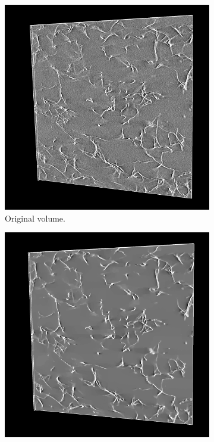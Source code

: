\begin{figure}[H]
  \centering
  \begin{subfigure}{0.5\textwidth}
    \centering
    \includegraphics[width=0.9\linewidth]{Figures/chapter-image/pipeline_screenshots/pectin_original.png}
    \caption{Original volume.}
    \label{fig:pectin_original}
  \end{subfigure}%
  \begin{subfigure}{0.5\textwidth}
    \centering
    \includegraphics[width=0.9\linewidth]{Figures/chapter-image/pipeline_screenshots/pectin_denoised_tv20.png}

\end{subfigure}
\end{figure}
